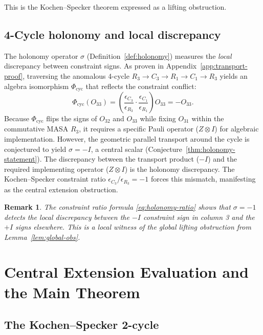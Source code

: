 \documentclass[11pt]{article}
\newtheorem{remark}[theorem]{Remark}
\begin{document}
This is the Kochen--Specker theorem expressed as a lifting obstruction.

\subsection{4-Cycle holonomy and local discrepancy}

The holonomy operator $\sigma$ (Definition~\ref{def:holonomy})
measures the \emph{local} discrepancy between constraint signs.
As proven in Appendix~\ref{app:transport-proof}, traversing the anomalous
4-cycle $R_3 \to C_3 \to R_1 \to C_1 \to R_3$ yields an algebra isomorphism
$\Phi_{\mathrm{cyc}}$ that reflects the constraint conflict:
\begin{equation}
\label{eq:holonomy-ratio}
\Phi_{\mathrm{cyc}}(O_{33}) = \left( \frac{\epsilon_{C_3}}{\epsilon_{R_3}} \cdot \frac{\epsilon_{C_1}}{\epsilon_{R_1}} \right) O_{33} = -O_{33}.
\end{equation}
Because $\Phi_{\mathrm{cyc}}$ flips the signs of $O_{32}$ and $O_{33}$ while
fixing $O_{31}$ within the commutative MASA $R_3$, it requires a specific Pauli
operator ($Z \otimes I$) for algebraic implementation. However, the geometric
parallel transport around the cycle is conjectured to yield $\sigma = -I$, a central scalar
(Conjecture~\ref{thm:holonomy-statement}).
The discrepancy between the transport product ($-I$) and the required
implementing operator ($Z \otimes I$) is the holonomy discrepancy. The
Kochen--Specker constraint ratio $\epsilon_{C_3}/\epsilon_{R_3} = -1$ forces
this mismatch, manifesting as the central extension obstruction.

\begin{remark}
The constraint ratio formula \eqref{eq:holonomy-ratio} shows that
$\sigma = -1$ detects the local discrepancy between the $-I$ constraint
sign in column 3 and the $+I$ signs elsewhere. This is a \emph{local
witness} of the global lifting obstruction from Lemma~\ref{lem:global-obs}.
\end{remark}

\section{Central Extension Evaluation and the Main Theorem}
\label{sec:central}

\subsection{The Kochen--Specker 2-cycle}
\end{document}
